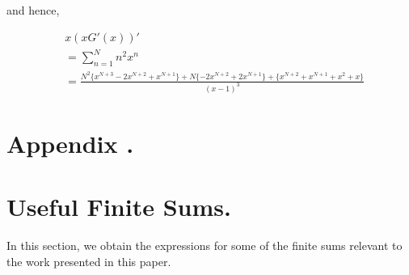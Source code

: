 \begin{multicols}{2}
and hence,

\vspace{-.6cm}

{\fontsize{6}{7}\selectfont\begin{align*}
&\nonumber x(xG'(x))'\\
 &= \displaystyle{\sum_{n=1}^{N}}n^2x^n \\
&= \displaystyle{\frac{N^2\{x^{N+3}-2x^{N+2}+x^{N+1}\}+ N\{-2x^{N+2}+2x^{N+1}\}+\{x^{N+2}+x^{N+1}+x^2+x\}}{(x-1)^3}}\tag{A.4}\label{A.4}
\end{align*}}

\vspace{-.8cm}

\section*{Appendix .\label{section-app-b}}
\section*{Useful Finite Sums.}\label{app-b}
In this section, we obtain the expressions for some of the finite sums relevant to the work presented in this paper. 

\end{multicols}
